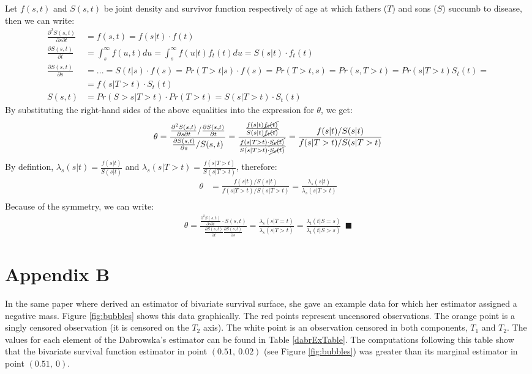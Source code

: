 \documentclass[]{article}
\begin{document}
Let $f(s,t)$ and $S(s,t)$ be joint density and survivor function respectively of age at which fathers ($T$) and sons ($S$) succumb to disease, then we can write:
	$$
	\begin{aligned}
		\frac{\partial^2 S(s, t)}{\partial s\partial t} &= f(s,t) = f(s|t)\cdot f(t)\\
		\frac{\partial S(s,t)}{\partial t} &= \int_s^{\infty}f(u, t)du = \int_s^{\infty}f(u|t)f_t(t)du = S(s|t)\cdot f_t(t)\\
		\frac{\partial S(s,t)}{\partial s} &=...= S(t|s)\cdot f(s) = Pr(T>t|s)\cdot f(s) = Pr(T>t, s) = Pr(s,T>t) = Pr(s|T>t)S_t(t) = \\
		&=f(s|T>t)\cdot S_t(t)\\
		S(s,t) &= Pr(S>s|T>t)\cdot Pr(T>t) = S(s|T>t)\cdot S_t(t)
	\end{aligned}
	$$
By substituting the right-hand sides of the above equalities into the expression for $\theta$, we get:
	$$
	\begin{aligned}
		\theta &= \frac{\frac{\partial^2 S(s, t)}{\partial s\partial t}/\frac{\partial S(s, t)}{\partial t}}  {\frac{\partial S(s, t)}{\partial s}/ S(s, t) } = \frac{  \frac{f(s|t)\cancel{f_t(t)}}{S(s|t)\cancel{f_t(t)}} } { \frac{f(s|T>t)\cdot \cancel{S_t(t)}}{S(s|T>t)\cdot \cancel{S_t(t)}}  }
		  = \frac{f(s|t)/S(s|t)}     {f(s|T>t) / S(s|T>t) }\\
	\end{aligned}
	$$
By defintion, $\lambda_s(s|t) = \frac{f(s|t)}{S(s|t)}$ and $\lambda_s(s|T>t) = \frac{f(s|T>t)}{S(s|T>t)}$, therefore:
	$$
	\begin{aligned}
		\theta &=\frac{f(s|t)/S(s|t)}     {f(s|T>t) / S(s|T>t) }
		= \frac{\lambda_s(s|t) } {\lambda_s(s|T>t) }\\
	\end{aligned}
	$$
Because of the symmetry, we can write:
	$$
	\begin{aligned}
	  \theta = \frac{ \frac{\partial^2 S(s, t)}{\partial s\partial t} \cdot S(s, t)}    {\frac{\partial S(s, t)}{\partial t} \frac{\partial S(s, t)}{\partial s}} = \frac{ \lambda_s(s|T=t)}{\lambda_s(s|T>t)} = \frac{ \lambda_t(t|S=s)}{\lambda_t(t|S>s)}~~\blacksquare
	\end{aligned}
	$$
\clearpage

\section{Appendix B} \label{appendixB}

In the same paper where \cite{dabrowska1988kaplan} derived an estimator of bivariate survival surface, she gave an example data for which her estimator assigned a negative mass. Figure \ref{fig:bubbles} shows this data graphically. The red points represent uncensored observations. The orange point is a singly censored observation (it is censored on the $T_2$ axis). The white point is an observation censored in both components, $T_1$ and $T_2$. The values for each element of the Dabrowska's estimator can be found in Table \ref{dabrExTable}. The computations following this table show that the bivariate survival function estimator in point $(0.51,~0.02)$ (see Figure \ref{fig:bubbles}) was greater than its marginal estimator in point $(0.51,~0)$. 
\end{document}
